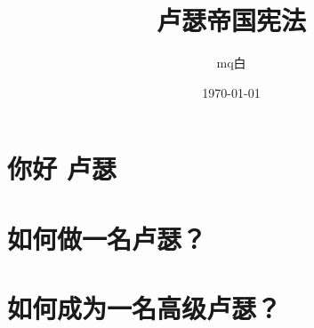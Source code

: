 \documentclass[11pt,a4paper]{ctexart}
\title{卢瑟帝国宪法 }
\author{mq白}
\date{\today}
\begin{document}
\maketitle

\section{你好 卢瑟}



\section{如何做一名卢瑟？}



\section{如何成为一名高级卢瑟？}


\end{document}
